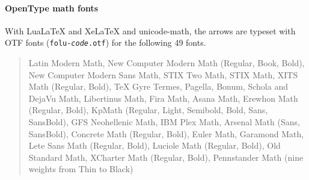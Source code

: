 \documentclass[dvipdfmx,a4paper]{article}
\newcommand\pkg[1]{\textsf{#1}}
\newcommand\file[1]{\texttt{#1}}
\begin{document}
\paragraph{OpenType math fonts}
With Lua\LaTeX{} and Xe\LaTeX{} and \pkg{unicode-math}, the arrows are typeset with OTF fonts
(\file{folu-\textit{code}.otf}) for the following 49 fonts.
\begin{quote}\small
Latin Modern Math, New Computer Modern Math (Regular, Book, Bold), New Computer Modern Sans Math,
STIX Two Math, STIX Math, XITS Math (Regular, Bold), \TeX{} Gyre Termes, Pagella, Bonum, Schola and DejaVu Math,
Libertinus Math, Fira Math, Asana Math, Erewhon Math (Regular, Bold),
KpMath (Regular, Light, Semibold, Bold, Sans, SansBold), GFS Neohellenic Math, IBM Plex Math,
Arsenal Math (Sans, SansBold), Concrete Math (Regular, Bold), Euler Math, Garamond Math,
Lete Sans Math (Regular, Bold), Luciole Math (Regular, Bold), Old Standard Math,
XCharter Math (Regular, Bold), Pennstander Math (nine weights from Thin to Black)
\end{quote}
\end{document}
